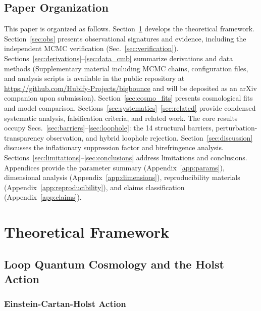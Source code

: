 \documentclass[aps,prd,twocolumn,superscriptaddress,showpacs,preprintnumbers,nofootinbib,longbibliography,floatfix]{revtex4-2}
\begin{document}
\subsection{Paper Organization}

This paper is organized as follows. Section~\ref{sec:theory} develops the theoretical framework. Section~\ref{sec:obs} presents observational signatures and evidence, including the independent MCMC verification (Sec.~\ref{sec:verification}). Sections~\ref{sec:derivations}--\ref{sec:data_cmb} summarize derivations and data methods (Supplementary material including MCMC chains, configuration files, and analysis scripts is available in the public repository at \url{https://github.com/Hubify-Projects/bigbounce} and will be deposited as an arXiv companion upon submission). Section~\ref{sec:cosmo_fits} presents cosmological fits and model comparison. Sections~\ref{sec:systematics}--\ref{sec:related} provide condensed systematic analysis, falsification criteria, and related work. The core results occupy Secs.~\ref{sec:barriers}--\ref{sec:loophole}: the 14 structural barriers, perturbation-transparency observation, and hybrid loophole rejection. Section~\ref{sec:discussion} discusses the inflationary suppression factor and birefringence analysis. Sections~\ref{sec:limitations}--\ref{sec:conclusions} address limitations and conclusions. Appendices provide the parameter summary (Appendix~\ref{app:params}), dimensional analysis (Appendix~\ref{app:dimensions}), reproducibility materials (Appendix~\ref{app:reproducibility}), and claims classification (Appendix~\ref{app:claims}).


\section{Theoretical Framework}\label{sec:theory}

\subsection{Loop Quantum Cosmology and the Holst Action}\label{sec:holst}

\subsubsection{Einstein-Cartan-Holst Action}
\end{document}
